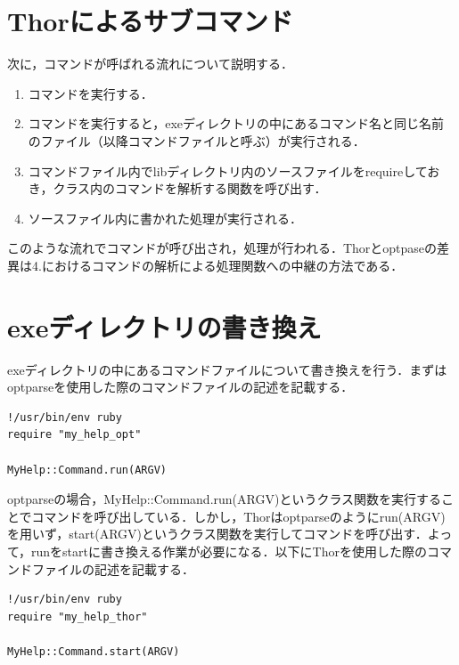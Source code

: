 \section{Thorによるサブコマンド}\label{thorux306bux3088ux308bux30b5ux30d6ux30b3ux30deux30f3ux30c9}

次に，コマンドが呼ばれる流れについて説明する．

\begin{enumerate}
\def\labelenumi{\arabic{enumi}.}
\tightlist
\item
  コマンドを実行する．
\item
  コマンドを実行すると，exeディレクトリの中にあるコマンド名と同じ名前のファイル（以降コマンドファイルと呼ぶ）が実行される．
\item
  コマンドファイル内でlibディレクトリ内のソースファイルをrequireしておき，クラス内のコマンドを解析する関数を呼び出す．
\item
  ソースファイル内に書かれた処理が実行される．
\end{enumerate}

このような流れでコマンドが呼び出され，処理が行われる．Thorとoptpaseの差異は4.におけるコマンドの解析による処理関数への中継の方法である．

\section{exeディレクトリの書き換え}\label{exeux30c7ux30a3ux30ecux30afux30c8ux30eaux306eux66f8ux304dux63dbux3048}

exeディレクトリの中にあるコマンドファイルについて書き換えを行う．まずはoptparseを使用した際のコマンドファイルの記述を記載する．

\begin{screen}
{\small
\begin{verbatim}
!/usr/bin/env ruby                                                                                                               
require "my_help_opt"

MyHelp::Command.run(ARGV)
\end{verbatim}}
\end{screen}

optparseの場合，MyHelp::Command.run(ARGV)というクラス関数を実行することでコマンドを呼び出している．しかし，Thorはoptparseのようにrun(ARGV)を用いず，start(ARGV)というクラス関数を実行してコマンドを呼び出す．よって，runをstartに書き換える作業が必要になる．以下にThorを使用した際のコマンドファイルの記述を記載する．

\begin{screen}
{\small
\begin{verbatim}
!/usr/bin/env ruby                                                                                                               
require "my_help_thor"

MyHelp::Command.start(ARGV)
\end{verbatim}}
\end{screen}

